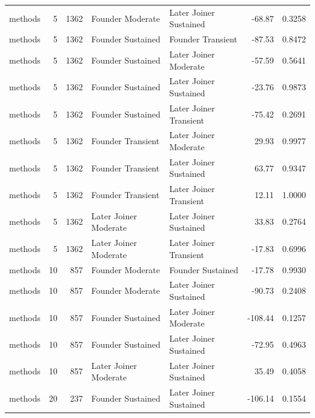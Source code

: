 \begin{table}[H]
{\begin{tabular}{l r r l l r r}
methods & 5 & 1362 & Founder Moderate & Later Joiner Sustained & -68.87 & 0.3258 \\ 
methods & 5 & 1362 & Founder Sustained & Founder Transient & -87.53 & 0.8472 \\ 
methods & 5 & 1362 & Founder Sustained & Later Joiner Moderate & -57.59 & 0.5641 \\ 
methods & 5 & 1362 & Founder Sustained & Later Joiner Sustained & -23.76 & 0.9873 \\ 
methods & 5 & 1362 & Founder Sustained & Later Joiner Transient & -75.42 & 0.2691 \\ 
methods & 5 & 1362 & Founder Transient & Later Joiner Moderate & 29.93 & 0.9977 \\ 
methods & 5 & 1362 & Founder Transient & Later Joiner Sustained & 63.77 & 0.9347 \\ 
methods & 5 & 1362 & Founder Transient & Later Joiner Transient & 12.11 & 1.0000 \\ 
methods & 5 & 1362 & Later Joiner Moderate & Later Joiner Sustained & 33.83 & 0.2764 \\ 
methods & 5 & 1362 & Later Joiner Moderate & Later Joiner Transient & -17.83 & 0.6996 \\ 
methods & 10 & 857 & Founder Moderate & Founder Sustained & -17.78 & 0.9930 \\ 
methods & 10 & 857 & Founder Moderate & Later Joiner Sustained & -90.73 & 0.2408 \\ 
methods & 10 & 857 & Founder Sustained & Later Joiner Moderate & -108.44 & 0.1257 \\ 
methods & 10 & 857 & Founder Sustained & Later Joiner Sustained & -72.95 & 0.4963 \\ 
methods & 10 & 857 & Later Joiner Moderate & Later Joiner Sustained & 35.49 & 0.4058 \\ 
methods & 20 & 237 & Founder Sustained & Later Joiner Sustained & -106.14 & 0.1554 \\ 
\bottomrule
\end{tabular}%
} 
\end{table}
\newpage 
